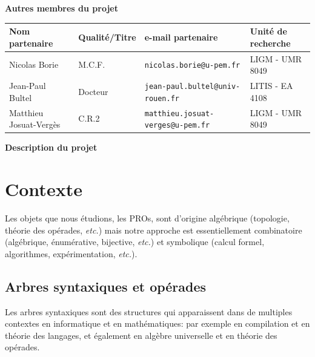 \documentclass[10pt,reqno]{amsart}
\numberwithin{equation}{subsection}
\begin{document}
\Large{\bf{Autres membres du projet}}

\begin{center}
\begin{small}
\begin{tabular}{|m{3.5cm}|m{2.5cm}|m{5.25cm}|m{3.25cm}|}\hline
    \bf{Nom partenaire} & \bf{Qualité/Titre} & \bf{e-mail partenaire}
        & \bf{Unité de recherche } \\ \hline
    Nicolas Borie & M.C.F. & {\tt nicolas.borie@u-pem.fr}
        & LIGM - UMR 8049 \\ \hline
    Jean-Paul Bultel & Docteur & {\tt jean-paul.bultel@univ-rouen.fr}
        & LITIS - EA 4108 \\ \hline
  Matthieu Josuat-Vergès \qquad & C.R.2 & {\tt matthieu.josuat-verges@u-pem.fr}
   \qquad
    & LIGM - UMR 8049 \qquad \\ \hline
\end{tabular}
\end{small}
\end{center}
\bigskip

\Large{\bf{Description du projet}}

\section{Contexte}


Les objets que nous étudions, les PROs, sont d'origine algébrique 
(topologie, théorie des opérades, {\em etc.}) mais notre approche est
essentiellement combinatoire (algébrique, énumérative, bijective, {\em etc.}) 
et symbolique (calcul formel, algorithmes, expérimentation, {\em etc.}).

\subsection{Arbres syntaxiques et opérades}
Les arbres syntaxiques sont des structures qui apparaissent 
dans de multiples contextes en informatique et en mathématiques: 
par exemple en compilation et en théorie des langages, et également en 
algèbre universelle et en théorie des opérades.
\end{document}
